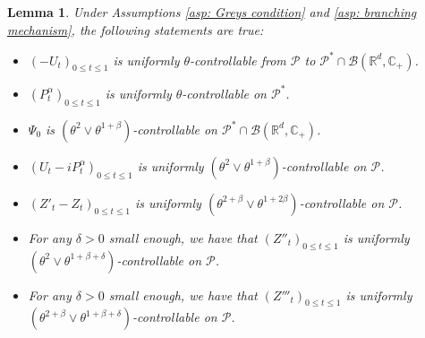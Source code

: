 \documentclass[12pt,a4paper]{amsart}
\theoremstyle{plain}
\newtheorem{lem}[thm]{Lemma}
\theoremstyle{definition}
\numberwithin{equation}{section}
\begin{document}
\begin{lem}
\label{lem: upper bound for usgx}
        Under Assumptions \ref{asp: Greys condition} and \ref{asp: branching mechanism}, the following statements are true:
\begin{itemize}
\item[(1)]
    $(-U_t)_{0\leq t\leq 1}$ is uniformly $\theta$-controllable from $\mathcal P$ to $\mathcal P^*\cap \mathcal B(\mathbb R^d, \mathbb C_+)$.
\item[(2)]
    $(P^\alpha_t)_{0\leq t\leq 1}$ is uniformly $\theta$-controllable on $\mathcal P^*$.
\item[(3)]
       $\Psi_0$ is $(\theta^2\vee \theta^{1+\beta})$-controllable on $\mathcal P^* \cap \mathcal B(\mathbb R^d, \mathbb C_+)$.
\item[(4)]
    $(U_t- iP_t^{\alpha})_{0\leq t\leq 1}$ is uniformly $(\theta^2\vee \theta^{1+\beta})$-controllable on $\mathcal P$.
\item[(5)]
        $(Z'_t-Z_t)_{0\leq t\leq 1}$ is uniformly $(\theta^{2+\beta}\vee \theta^{1+2\beta})$-controllable on $\mathcal P$.
\item[(6)]
        For any $\delta > 0$ small enough, we have that $(Z''_t)_{0\leq t\leq 1}$ is uniformly $(\theta^2\vee \theta^{1+\beta+\delta})$-controllable on $\mathcal P$.
\item[(7)]
       For any $\delta > 0$ small enough, we have that $(Z'''_t)_{0\leq t\leq 1}$ is uniformly $(\theta^{2+\beta}\vee \theta^{1+\beta+\delta})$-controllable on $\mathcal P$.
\end{itemize}
\end{lem}
\end{document}
